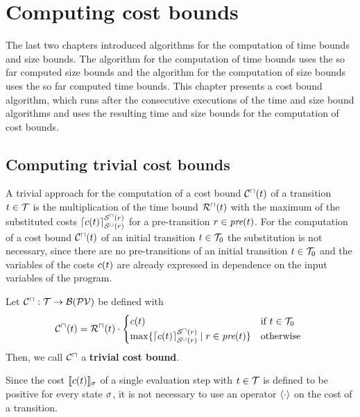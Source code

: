 \section{Computing cost bounds}

The last two chapters introduced algorithms for the computation of time bounds and size bounds.
The algorithm for the computation of time bounds uses the so far computed size bounds and the algorithm for the computation of size bounds uses the so far computed time bounds.
This chapter presents a cost bound algorithm, which runs after the consecutive executions of the time and size bound algorithms and uses the resulting time and size bounds for the computation of cost bounds.

\subsection{Computing trivial cost bounds}

A trivial approach for the computation of a cost bound ${\mathcal{C}^\sqcap}(t)$ of a transition $t \in \mathcal{T}$ is the multiplication of the time bound ${\mathcal{R}^\sqcap}(t)$ with the maximum of the substituted costs $\lceil c(t) \rceil^{{\mathcal{S}^\sqcap}(r)}_{{\mathcal{S}^\sqcup}(r)}$ for a pre-transition $r \in \emph{pre}(t)$.
For the computation of a cost bound ${\mathcal{C}^\sqcap}(t)$ of an initial transition $t \in \mathcal{T}_0$ the substitution is not necessary, since there are no pre-transitions of an initial transition $t \in \mathcal{T}_0$ and the variables of the costs $c(t)$ are already expressed in dependence on the input variables of the program.

\begin{definition}
  Let ${\mathcal{C}^\sqcap}: \mathcal{T} \rightarrow \mathcal{B}(\mathcal{PV})$ be defined with
  \[ {\mathcal{C}^\sqcap}(t) = {\mathcal{R}^\sqcap}(t) \cdot
  \begin{cases}
    c(t) & \text{if } t \in \mathcal{T}_0 \\
    \max \lbrace \lceil c(t) \rceil^{{\mathcal{S}^\sqcap}(r)}_{{\mathcal{S}^\sqcup}(r)} \mid r \in \emph{pre}(t) \rbrace & \text{otherwise }
  \end{cases}
  \]
  Then, we call ${\mathcal{C}^\sqcap}$ a \textbf{trivial cost bound}. 
\end{definition}

Since the cost $\llbracket c(t) \rrbracket_{\sigma}$ of a single evaluation step with $t \in \mathcal{T}$ is defined to be positive for every state $\sigma$, it is not necessary to use an operator $\langle\cdot\rangle$ on the cost of a transition.

